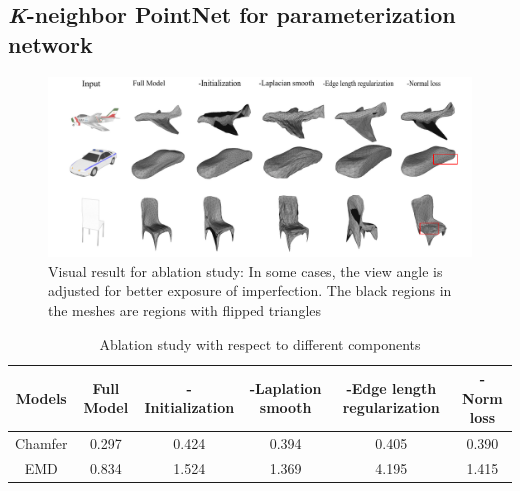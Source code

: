 \subsection{\textit{K}-neighbor PointNet for parameterization network} 
\label{subsec:k-n_point_net}

\begin{figure}[htbp]
	\centering
	\includegraphics[width=\linewidth]{img/abl/abl}
	\caption{Visual result for ablation study: In some cases, the view angle is adjusted for better exposure of imperfection. The black regions in the meshes are regions with flipped triangles}
	\label{fig:abl}
\end{figure}

\begin{table}
	\caption{Ablation study with respect to different components}
	\label{tab:ablation}
	\centering
	\begin{tabular}{c | c c c c c}
		Models &  Full Model  & -Initialization & -Laplation smooth & -Edge length regularization & -Norm loss \\
		\hline
		Chamfer      & 0.297 & 0.424 & 0.394 & 0.405  & 0.390\\
		EMD			 & 0.834 & 1.524 & 1.369 & 4.195  & 1.415
	\end{tabular}
\end{table}

